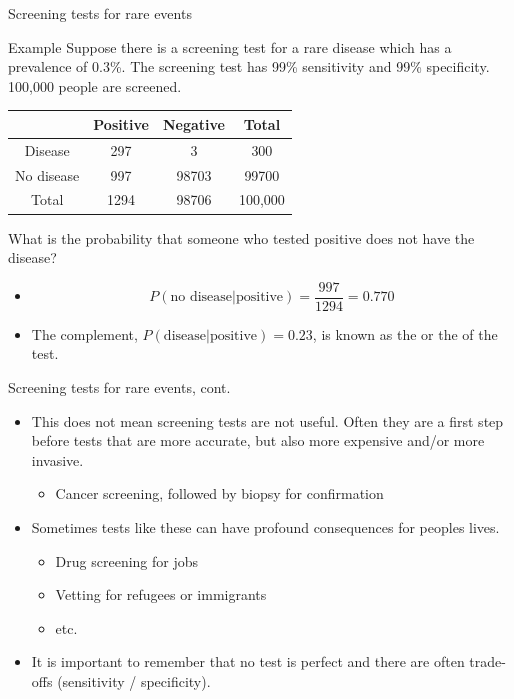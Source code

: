 \documentclass[xcolor=table]{beamer}
\begin{document}
\begin{frame}{Screening tests for rare events}
\begin{exampleblock}{Example}
Suppose there is a screening test for a rare disease which has a prevalence of 0.3\%. The screening test has 99\% sensitivity and 99\% specificity. 100,000 people are screened.\\
\smallskip
{\centering \renewcommand{\arraystretch}{1}
\begin{tabular}{c | c  c | c}
 & Positive & Negative & Total \\
\hline
Disease & 297 & 3 & 300\\
No disease & 997 & 98703 & 99700\\
\hline
Total & 1294 & 98706 & 100,000 
\end{tabular}\par
\renewcommand{\arraystretch}{1.5}
}
\smallskip
What is the probability that someone who tested positive does not have the disease?
\begin{itemize}
\pause
\item \[P(\text{no disease} | \text{positive}) = \frac {997}{1294} = 0.770\]
\vspace*{-\baselineskip}\pause
\item The complement, $P(\text{disease} | \text{positive}) = 0.23$, is known as the  or the  of the test.
\end{itemize}

\end{exampleblock}
\end{frame}

\begin{frame}{Screening tests for rare events, cont.}
\begin{block}{}
\begin{itemize}
\item This does not mean screening tests are not useful. Often they are a first step before tests that are more accurate, but also more expensive and/or more invasive.
\begin{itemize}
\item Cancer screening, followed by biopsy for confirmation
\end{itemize}

\pause
\item Sometimes tests like these can have profound consequences for peoples lives.
\begin{itemize}
\item Drug screening for jobs
\item Vetting for refugees or immigrants 
\item etc.
\end{itemize}

\pause
\item It is important to remember that no test is perfect and there are often trade-offs (sensitivity / specificity).
\end{itemize}
\end{block}
\end{frame}
\end{document}
